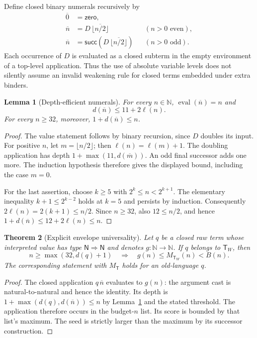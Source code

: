 \documentclass[11pt]{article}
\newtheorem{theorem}{Theorem}[section]
\newtheorem{lemma}[theorem]{Lemma}
\theoremstyle{definition}
\newcommand{\N}{\mathbb N}
\newcommand{\T}{\mathsf T}
\newcommand{\TW}{\mathsf T_W}
\newcommand{\ev}{\operatorname{eval}}
\newcommand{\MT}{M_{\T}}
\newcommand{\MW}{M_{\TW}}
\newcommand{\enc}[1]{\overline{#1}}
\begin{document}
Define closed binary numerals recursively by
\begin{align*}
 \enc0&=\mathsf{zero},\\
 \enc n&=D\,\enc{\lfloor n/2\rfloor} &&(n>0\text{ even}),\\
 \enc n&=\mathsf{succ}(D\,\enc{\lfloor n/2\rfloor})
                                      &&(n>0\text{ odd}).
\end{align*}
Each occurrence of $D$ is evaluated as a closed subterm in the empty environment
of a top-level application. Thus the use of absolute variable levels does not
silently assume an invalid weakening rule for closed terms embedded under extra
binders.

\begin{lemma}[Depth-efficient numerals]\label{lem:numerals}
For every $n\in\N$, $\ev(\enc n)=n$ and
\[
                   d(\enc n)\le 11+2\ell(n).
\]
For every $n\ge32$, moreover, $1+d(\enc n)\le n$.
\end{lemma}
\begin{proof}
The value statement follows by binary recursion, since $D$ doubles its input.
For positive $n$, let $m=\lfloor n/2\rfloor$; then $\ell(n)=\ell(m)+1$.
The doubling application has depth $1+\max(11,d(\enc m))$. An odd final
successor adds one more. The induction hypothesis therefore gives the displayed
bound, including the case $m=0$.

For the last assertion, choose $k\ge5$ with $2^k\le n<2^{k+1}$. The elementary
inequality $k+1\le2^{k-2}$ holds at $k=5$ and persists by induction. Consequently
$2\ell(n)=2(k+1)\le n/2$. Since $n\ge32$, also $12\le n/2$, and hence
$1+d(\enc n)\le12+2\ell(n)\le n$.
\end{proof}

\begin{theorem}[Explicit envelope universality]\label{thm:universal}
Let $q$ be a closed raw term whose interpreted value has type
$\mathsf N\Rightarrow\mathsf N$ and denotes $g:\N\to\N$. If $q$ belongs to
$\TW$, then
\[
  n\ge\max(32,d(q)+1)\quad\Longrightarrow\quad g(n)\le\MW(n)<B(n).
\]
The corresponding statement with $\MT$ holds for an old-language $q$.
\end{theorem}
\begin{proof}
The closed application $q\,\enc n$ evaluates to $g(n)$: the argument cast is
natural-to-natural and hence the identity. Its depth is
$1+\max(d(q),d(\enc n))\le n$ by Lemma~\ref{lem:numerals} and the stated
threshold. The application therefore occurs in the budget-$n$ list. Its score
is bounded by that list's maximum. The seed is strictly larger than the maximum
by its successor construction.
\end{proof}
\end{document}
